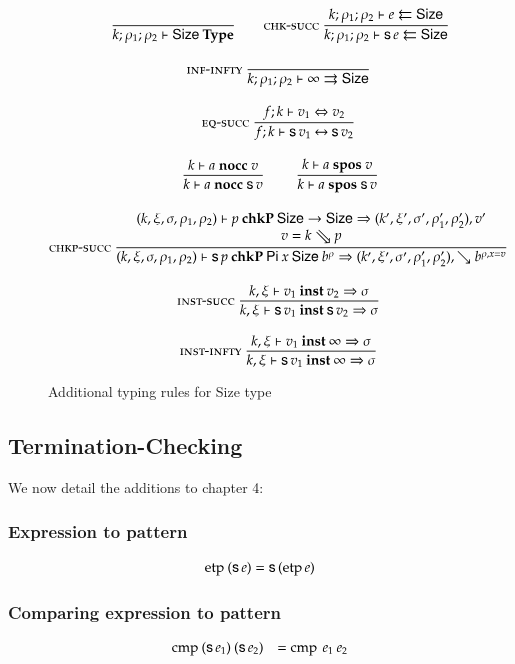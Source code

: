 \begin{figure}[htp]
\begin{gather*}
\nru{}{}{\IsType{k}{\rho_1}{\rho_2}{\Size}}
\qquad
\nru{\chksucc}
{\Check{k}{\rho_1}{\rho_2}{e}{\Size}}
{\Check{k}{\rho_1}{\rho_2}{\s e}{\Size}} 
\\[2ex]
\nru{\infinfty}{}{\Infer{k}{\rho_1}{\rho_2}{\infty}{\Size}} 
\\[2ex]
\nru{\eqsuc}
{\EqVal{f}{k}{v_1}{v_2}}
{\FeqVal{f}{k}{\s v_1}{\s v_2}}
\\[2ex]
\nru{}
{\nocc{k}{a}{v}}
{\nocc{k}{a}{\s v}}
\qquad
\nru{}
{\spos{k}{a}{v}}
{\spos{k}{a}{\s v}}
\\[2ex]
\ndru{\chkpsucc}
{
\checkp{k,\xi,\sigma,\rho_1,\rho_2}{p}{\Size \ra \Size}
{k',\xi',\sigma',\rho'_1,\rho'_2}{v'}}
{v = \ptv{k}{p} }
{
\checkp
{k,\xi,\sigma,\rho_1,\rho_2}
{\s p}
{\vpi \: x \: \Size \: \cl{b}{\rho}}
{k',\xi',\sigma',\rho'_1,\rho'_2}{\wh \cl{b}{\ins{\rho}{x}{v}}}}
\\[2ex]
\nru{\unifys}
{\unify{k}{\xi}{v_1}{v_2}{\sigma}}
{\unify{k}{\xi}{\s v_1}{\s v_2}{\sigma}
}
\\[2ex]
\nru{\unifyi}
{\unify{k}{\xi}{v_1}{\infty}{\sigma}}
{\unify{k}{\xi}{\s v_1}{\infty}{\sigma}
}
\end{gather*}
\caption{Additional typing rules for Size type}
\label{fadd}
\end{figure}

\subsection{Termination-Checking}

We now detail the additions to chapter 4:

\subsubsection{Expression to pattern}
\[
\begin{array}[t]{ll}
\operatorname{etp} \: (\mathsf{s}\, e) = \mathsf{s}\, (\operatorname{etp} e) \\
\end{array}
\]

\subsubsection{Comparing expression to pattern}
\[
\begin{array}[t]{ll}
\operatorname{cmp} \: (\mathsf{s}\, e_1) \: (\mathsf{s}\, e_2) & = \operatorname{cmp} \: e_1 \: e_2 \\
\end{array}
\]

